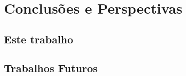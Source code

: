 



\chapter{Conclusões e Perspectivas}
\label{sec:conclusao}


\section{Este trabalho}
\label{sec:conclusao:this}




\section{Trabalhos Futuros}
\label{sec:conclusao:future}


